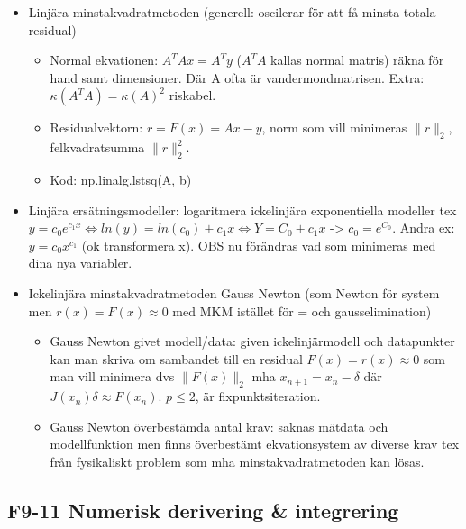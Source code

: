 \documentclass[a4paper]{article}
\begin{document}
\begin{itemize}
\begin{itemize}
        \end{itemize}
    \item Linjära minstakvadratmetoden (generell: oscilerar för att få minsta totala residual)
        \begin{itemize}
            \item Normal ekvationen: $A^TAx=A^Ty$ ($A^TA$ kallas normal matris) räkna för hand samt dimensioner. Där A ofta är vandermondmatrisen. Extra: $\kappa(A^TA)=\kappa(A)^2$ riskabel.
            \item Residualvektorn: $r=F(x)=Ax-y$, norm som vill minimeras $\|r\|_2$, felkvadratsumma $\|r\|_2^2$.
            \item Kod: np.linalg.lstsq(A, b)
        \end{itemize}
    \item Linjära ersätningsmodeller: logaritmera ickelinjära exponentiella modeller tex $y=c_0e^{c_1x} \Leftrightarrow ln(y)=ln(c_0)+c_1x \Leftrightarrow Y=C_0+c_1x$ -> $c_0=e^{C_0}$. Andra ex: $y=c_0x^{c_1}$ (ok transformera x). OBS nu förändras vad som minimeras med dina nya variabler.
    \item Ickelinjära minstakvadratmetoden Gauss Newton (som Newton för system men $r(x)=F(x)\approx 0$ med MKM istället för = och gausselimination)
        \begin{itemize}
            \item Gauss Newton givet modell/data: given ickelinjärmodell och datapunkter kan man skriva om sambandet till en residual $F(x)=r(x)\approx 0$ som man vill minimera dvs $\|F(x)\|_2$ mha $x_{n+1}=x_n-\delta$ där $J(x_n)\delta\approx F(x_n)$. $p\leq 2$, är fixpunktsiteration.
            \item Gauss Newton överbestämda antal krav: saknas mätdata och modellfunktion men finns överbestämt ekvationsystem av diverse krav tex från fysikaliskt problem som mha minstakvadratmetoden kan lösas.
        \end{itemize}
\end{itemize}

\subsection{F9-11 Numerisk derivering \& integrering}
\end{document}
